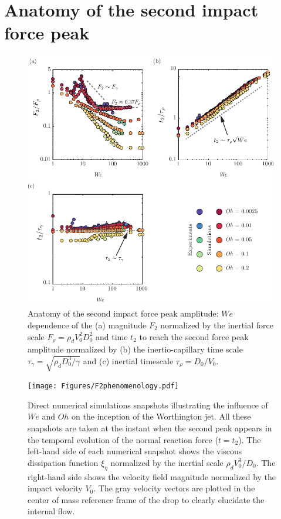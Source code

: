 \documentclass{jfm}
\begin{document}
\section{Anatomy of the second impact force peak}\label{sec:SecondPeak}

\begin{figure}
	\centering
	\includegraphics[width=\textwidth]{Figures/Force2_Anatomy_v4.pdf}
	\caption{Anatomy of the second impact force peak amplitude: $We$ dependence of the (a) magnitude $F_2$ normalized by the inertial force scale $F_\rho = \rho_dV_0^2D_0^2$ and time $t_2$ to reach the second force peak amplitude normalized by (b) the inertio-capillary time scale $\tau_\gamma = \sqrt{\rho_dD_0^3/\gamma}$ and (c) inertial timescale $\tau_\rho = D_0/V_0$.}
	\label{fig:F2Anatomy}
\end{figure}

\begin{figure}
	\centering
	\texttt{[image: Figures/F2phenomenology.pdf]}
	\caption{Direct numerical simulations snapshots illustrating the influence of $We$ and $Oh$ on the inception of the Worthington jet. All these snapshots are taken at the instant when the second peak appears in the temporal evolution of the normal reaction force ($t = t_2$). The left-hand side of each numerical snapshot shows the viscous dissipation function $\xi_\eta$ normalized by the inertial scale $\rho_dV_0^3/D_0$. The right-hand side shows the velocity field magnitude normalized by the impact velocity $V_0$. The gray velocity vectors are plotted in the center of mass reference frame of the drop to clearly elucidate the internal flow.}
	\label{fig:F2Phenomenology}
\end{figure}
\end{document}
